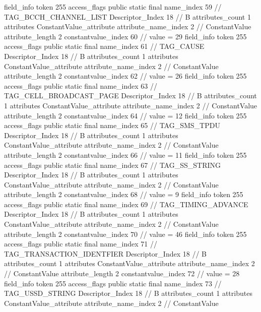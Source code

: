 {{{{{			}
			field_info {
				token	255
				access_flags	public static final
				name_index	59		// TAG_BCCH_CHANNEL_LIST
				Descriptor_Index	18		// B
				attributes_count	1
				attributes {
				ConstantValue_attribute {
					attribute_name_index	2		// ConstantValue
					attribute_length	2
					constantvalue_index	60		// value = 29
				}
				}
			}
			field_info {
				token	255
				access_flags	public static final
				name_index	61		// TAG_CAUSE
				Descriptor_Index	18		// B
				attributes_count	1
				attributes {
				ConstantValue_attribute {
					attribute_name_index	2		// ConstantValue
					attribute_length	2
					constantvalue_index	62		// value = 26
				}
				}
			}
			field_info {
				token	255
				access_flags	public static final
				name_index	63		// TAG_CELL_BROADCAST_PAGE
				Descriptor_Index	18		// B
				attributes_count	1
				attributes {
				ConstantValue_attribute {
					attribute_name_index	2		// ConstantValue
					attribute_length	2
					constantvalue_index	64		// value = 12
				}
				}
			}
			field_info {
				token	255
				access_flags	public static final
				name_index	65		// TAG_SMS_TPDU
				Descriptor_Index	18		// B
				attributes_count	1
				attributes {
				ConstantValue_attribute {
					attribute_name_index	2		// ConstantValue
					attribute_length	2
					constantvalue_index	66		// value = 11
				}
				}
			}
			field_info {
				token	255
				access_flags	public static final
				name_index	67		// TAG_SS_STRING
				Descriptor_Index	18		// B
				attributes_count	1
				attributes {
				ConstantValue_attribute {
					attribute_name_index	2		// ConstantValue
					attribute_length	2
					constantvalue_index	68		// value = 9
				}
				}
			}
			field_info {
				token	255
				access_flags	public static final
				name_index	69		// TAG_TIMING_ADVANCE
				Descriptor_Index	18		// B
				attributes_count	1
				attributes {
				ConstantValue_attribute {
					attribute_name_index	2		// ConstantValue
					attribute_length	2
					constantvalue_index	70		// value = 46
				}
				}
			}
			field_info {
				token	255
				access_flags	public static final
				name_index	71		// TAG_TRANSACTION_IDENTFIER
				Descriptor_Index	18		// B
				attributes_count	1
				attributes {
				ConstantValue_attribute {
					attribute_name_index	2		// ConstantValue
					attribute_length	2
					constantvalue_index	72		// value = 28
				}
				}
			}
			field_info {
				token	255
				access_flags	public static final
				name_index	73		// TAG_USSD_STRING
				Descriptor_Index	18		// B
				attributes_count	1
				attributes {
				ConstantValue_attribute {
					attribute_name_index	2		// ConstantValue
}}}}}}}
